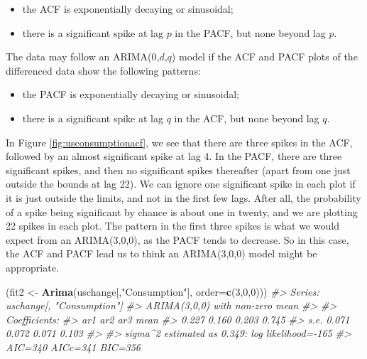 \documentclass[]{book}
\newenvironment{Shaded}{\begin{snugshade}}{\end{snugshade}}
\newcommand{\CommentTok}[1]{\textcolor[rgb]{0.56,0.35,0.01}{\textit{#1}}}
\newcommand{\DataTypeTok}[1]{\textcolor[rgb]{0.13,0.29,0.53}{#1}}
\newcommand{\DecValTok}[1]{\textcolor[rgb]{0.00,0.00,0.81}{#1}}
\newcommand{\KeywordTok}[1]{\textcolor[rgb]{0.13,0.29,0.53}{\textbf{#1}}}
\newcommand{\NormalTok}[1]{#1}
\newcommand{\StringTok}[1]{\textcolor[rgb]{0.31,0.60,0.02}{#1}}
\providecommand{\tightlist}{%
  \setlength{\itemsep}{0pt}\setlength{\parskip}{0pt}}
\begin{document}
\begin{itemize}
\tightlist
\item
  the ACF is exponentially decaying or sinusoidal;
\item
  there is a significant spike at lag \(p\) in the PACF, but none beyond lag \(p\).
\end{itemize}

The data may follow an ARIMA(0,\(d\),\(q\)) model if the ACF and PACF plots of the differenced data show the following patterns:

\begin{itemize}
\tightlist
\item
  the PACF is exponentially decaying or sinusoidal;
\item
  there is a significant spike at lag \(q\) in the ACF, but none beyond lag \(q\).
\end{itemize}

In Figure \ref{fig:usconsumptionacf}, we see that there are three spikes in the ACF, followed by an almost significant spike at lag 4. In the PACF, there are three significant spikes, and then no significant spikes thereafter (apart from one just outside the bounds at lag 22). We can ignore one significant spike in each plot if it is just outside the limits, and not in the first few lags. After all, the probability of a spike being significant by chance is about one in twenty, and we are plotting 22 spikes in each plot. The pattern in the first three spikes is what we would expect from an ARIMA(3,0,0), as the PACF tends to decrease. So in this case, the ACF and PACF lead us to think an ARIMA(3,0,0) model might be appropriate.

\begin{Shaded}
\begin{Highlighting}[]
\NormalTok{(fit2 <-}\StringTok{ }\KeywordTok{Arima}\NormalTok{(uschange[,}\StringTok{"Consumption"}\NormalTok{], }\DataTypeTok{order=}\KeywordTok{c}\NormalTok{(}\DecValTok{3}\NormalTok{,}\DecValTok{0}\NormalTok{,}\DecValTok{0}\NormalTok{)))}
\CommentTok{#> Series: uschange[, "Consumption"] }
\CommentTok{#> ARIMA(3,0,0) with non-zero mean }
\CommentTok{#> }
\CommentTok{#> Coefficients:}
\CommentTok{#>         ar1    ar2    ar3   mean}
\CommentTok{#>       0.227  0.160  0.203  0.745}
\CommentTok{#> s.e.  0.071  0.072  0.071  0.103}
\CommentTok{#> }
\CommentTok{#> sigma^2 estimated as 0.349:  log likelihood=-165}
\CommentTok{#> AIC=340   AICc=341   BIC=356}
\end{Highlighting}
\end{Shaded}
\end{document}
